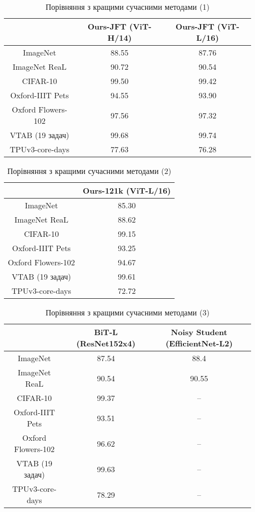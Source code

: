 \begin{table}[H]
    \caption{Порівняння з кращими сучасними методами (1)}
    \begin{tabular}{ c c c }
        \hline
         & Ours-JFT (ViT-H/14) & Ours-JFT (ViT-L/16)  \\ \hline
        ImageNet           & 88.55 & 87.76  \\ 
        ImageNet ReaL      & 90.72 & 90.54   \\ 
        CIFAR-10           & 99.50 & 99.42  \\ 
        Oxford-IIIT Pets   & 94.55 & 93.90  \\ 
        Oxford Flowers-102 & 97.56 & 97.32  \\ 
        VTAB (19 задач)    & 99.68 & 99.74  \\ \hline
        TPUv3-core-days    & 77.63 & 76.28  \\ \hline
    \end{tabular}
    \label{tab:t2}
\end{table}

\begin{table}[H]
    \caption{Порівняння з кращими сучасними методами (2)}
    \begin{tabular}{ c c }
        \hline
         & Ours-121k (ViT-L/16)  \\ \hline
        ImageNet           & 85.30   \\ 
        ImageNet ReaL      & 88.62   \\ 
        CIFAR-10           & 99.15   \\ 
        Oxford-IIIT Pets   & 93.25   \\ 
        Oxford Flowers-102 & 94.67   \\ 
        VTAB (19 задач)    & 99.61   \\ \hline
        TPUv3-core-days    & 72.72   \\ \hline
    \end{tabular}
    \label{tab:t3}
\end{table}

\begin{table}[H]
    \caption{Порівняння з кращими сучасними методами (3)}
    \begin{tabular}{ c c c }
        \hline
         & BiT-L (ResNet152x4) & Noisy Student (EfficientNet-L2)  \\ \hline
        ImageNet           & 87.54 & 88.4  \\ 
        ImageNet ReaL      & 90.54 & 90.55  \\ 
        CIFAR-10           & 99.37 & --  \\ 
        Oxford-IIIT Pets   & 93.51 & --  \\ 
        Oxford Flowers-102 & 96.62 & --  \\ 
        VTAB (19 задач)    & 99.63 & --  \\ \hline
        TPUv3-core-days    & 78.29 & --  \\ \hline
    \end{tabular}
    \label{tab:t4}
\end{table}


